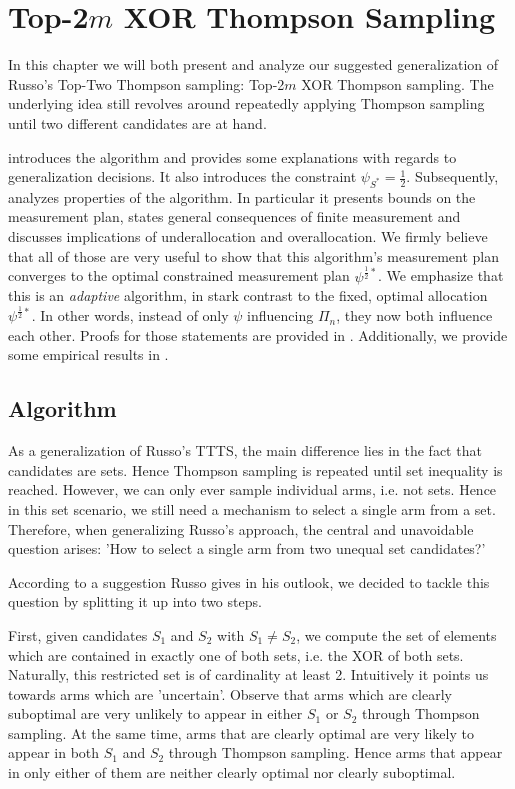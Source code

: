 \chapter{Top-2$m$ XOR Thompson Sampling}\label{chapter:algorithm}

In this chapter we will both present and analyze our suggested generalization of
Russo's Top-Two Thompson sampling: Top-2$m$ XOR Thompson sampling. The
underlying idea still revolves around repeatedly applying Thompson sampling
until two different candidates are at hand.

 introduces the algorithm and provides some explanations
with regards to generalization decisions. It also introduces the constraint
$\psi_{S^*} = \frac{1}{2}$. Subsequently,  analyzes
properties of the algorithm. In particular it presents bounds on the measurement
plan, states general consequences of finite measurement and discusses
implications of underallocation and overallocation. We firmly believe that all
of those are very useful to show that this algorithm's measurement plan
converges to the optimal constrained measurement plan $\psi^{\frac{1}{2}*}$. We
emphasize that this is an \emph{adaptive} algorithm, in stark contrast to the
fixed, optimal allocation $\psi^{\frac{1}{2}*}$. In other words, instead of only
$\psi$ influencing $\Pi_n$, they now both influence each other. Proofs for those
statements are provided in . Additionally, we provide
some empirical results in .

\section{Algorithm}\label{section:algorithm}
As a generalization of Russo's TTTS, the main difference lies in the fact that
candidates are sets. Hence Thompson sampling is repeated until set inequality is
reached. However, we can only ever sample individual arms, i.e. not sets. Hence
in this set scenario, we still need a mechanism to select a single arm from a
set. Therefore, when generalizing Russo's approach, the central and unavoidable
question arises: 'How to select a single arm from two unequal set candidates?'

According to a suggestion Russo gives in his outlook, we decided to tackle this
question by splitting it up into two steps.

First, given candidates $S_1$ and $S_2$ with $S_1 \neq S_2$, we compute the set
of elements which are contained in exactly one of both sets, i.e. the XOR of
both sets. Naturally, this restricted set is of cardinality at least 2.
Intuitively it points us towards arms which are 'uncertain'. Observe that arms
which are clearly suboptimal are very unlikely to appear in either $S_1$ or
$S_2$ through Thompson sampling. At the same time, arms that are clearly optimal
are very likely to appear in both $S_1$ and $S_2$ through Thompson sampling.
Hence arms that appear in only either of them are neither clearly optimal nor
clearly suboptimal.

